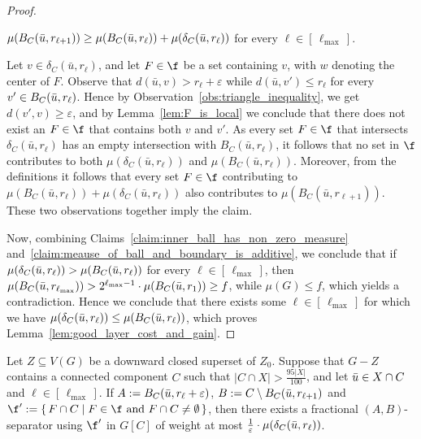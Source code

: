 \begin{proof}
    \begin{claim}\label{claim:meause_of_ball_and_boundary_is_additive}
        $\mu(B_C(\Bar{u}, r_{\ell+1})) \geq \mu(B_C(\Bar{u}, r_\ell)) + \mu(\delta_C(\Bar{u}, r_\ell))$ for every $\ell \in [\,\ell_{\max}\,]$.
    \end{claim}
    \begin{claimproof}
        Let $v \in \delta_C(\bar{u}, r_\ell)$, and let $F \in \f$ be a set containing $v$, with $w$ denoting the center of $F$. Observe that $d(\bar{u},v) > r_\ell + \varepsilon$ while $d(\bar{u},v') \leq r_\ell$ for every $v'\in B_C(\Bar{u}, r_\ell)$. Hence by Observation~\ref{obs:triangle_inequality}, we get $d(v',v) \geq \varepsilon$, and by Lemma~\ref{lem:F_is_local} we conclude that there does not exist an $F\in\f$ that contains both $v$ and $v'$. As every set $F \in \f$ that intersects $\delta_C(\bar{u}, r_\ell)$ has an empty intersection with $B_C(\bar{u}, r_\ell)$, it follows that no set in $\f$ contributes to both $\mu(\delta_C(\bar{u}, r_\ell))$ and $\mu(B_C(\bar{u}, r_\ell))$. Moreover, from the definitions it follows that every set $F \in \f$ contributing to $\mu(B_C(\bar{u}, r_\ell)) + \mu(\delta_C(\bar{u}, r_\ell))$ also contributes to $\mu(B_C(\bar{u}, r_{\ell+1}))$. These two observations together imply the claim.
    \end{claimproof}

    Now, combining Claims~\ref{claim:inner_ball_has_non_zero_measure} and~\ref{claim:meause_of_ball_and_boundary_is_additive}, we conclude that if $\mu(\delta_C(\Bar{u}, r_\ell)) > \mu(B_C(\Bar{u}, r_\ell))$ for every $\ell \in [\,\ell_{\max}\,]$, then $\mu(B_C(\Bar{u}, r_{\ell_{\max}})) > 2^{\ell_{\max} - 1} \cdot \mu(B_C(\Bar{u}, r_1)) \geq f$, while $\mu(G) \leq f$, which yields a contradiction. Hence we conclude that there exists some $\ell \in [\,\ell_{\max}\,]$ for which we have $\mu(\delta_C(\Bar{u}, r_\ell)) \leq \mu(B_C(\Bar{u}, r_\ell))$, which proves Lemma~\ref{lem:good_layer_cost_and_gain}.
\end{proof}

 
\begin{lemma}\label{lem:good_layer_frac_separator}
    Let $Z \subseteq V(G)$ be a downward closed superset of $Z_0$. Suppose that $G - Z$ contains a connected component $C$ such that $|C \cap X| > \frac{95|X|}{100}$, and let $\Bar{u} \in X \cap C$ and $\ell \in [\,\ell_{\max}\,]$. If $A := B_C(\Bar{u}, r_\ell + \varepsilon)$, $B := C \setminus B_C(\Bar{u}, r_{\ell+1})$ and $\f' := \{\,F \cap C \mid F \in \f \text{ and } F \cap C \neq \emptyset\,\}$, then there exists a fractional $(A,B)$-separator using $\f'$ in $G[C]$ of weight at most $\frac{1}{\varepsilon}\cdot\mu(\delta_C(\Bar{u}, r_\ell))$.
\end{lemma}

